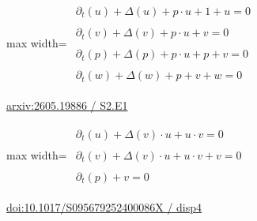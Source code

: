 \documentclass[UTF8,10pt,a4paper,fontset=mac]{ctexart}
\begin{document}
\begin{minipage}{\linewidth}\begin{center}\begin{adjustbox}{max width=\linewidth}$\displaystyle\begin{gathered}\begin{gathered}\partial_{t}(u)+\Delta(u)+p\cdot u+1+u=0\end{gathered}\\[5pt]\begin{gathered}\partial_{t}(v)+\Delta(v)+p\cdot u+v=0\end{gathered}\\[5pt]\begin{gathered}\partial_{t}(p)+\Delta(p)+p\cdot u+p+v=0\end{gathered}\\[5pt]\begin{gathered}\partial_{t}(w)+\Delta(w)+p+v+w=0\end{gathered}\end{gathered}$\end{adjustbox}\end{center}{\small\href{https://arxiv.org/html/2605.19886#S2.E1}{arxiv:2605.19886 / S2.E1}}\par\end{minipage}\par\vspace{6mm}

\begin{minipage}{\linewidth}\begin{center}\begin{adjustbox}{max width=\linewidth}$\displaystyle\begin{gathered}\begin{gathered}\partial_{t}(u)+\Delta(v)\cdot u+u\cdot v=0\end{gathered}\\[5pt]\begin{gathered}\partial_{t}(v)+\Delta(v)\cdot u+u\cdot v+v=0\end{gathered}\\[5pt]\begin{gathered}\partial_{t}(p)+v=0\end{gathered}\end{gathered}$\end{adjustbox}\end{center}{\small\href{https://www.cambridge.org/core/journals/european-journal-of-applied-mathematics/article/spatiotemporal-behaviour-of-sir-models-with-crossdiffusion-and-vital-dynamics/F33014FE3C7FC7F75F5608E66030C421#disp4}{doi:10.1017/S095679252400086X / disp4}}\par\end{minipage}\par\vspace{6mm}
\end{document}
